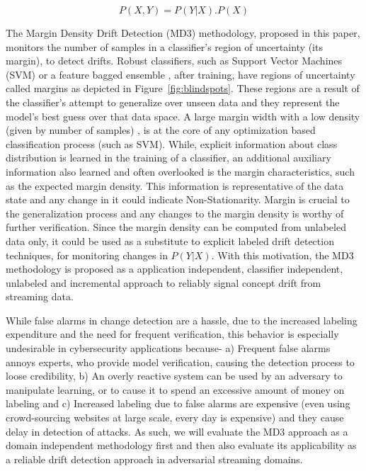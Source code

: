 \documentclass[authoryear,3p,times,twocolumn]{elsarticle}
\begin{document}
\begin{equation}
P(X,Y) = P(Y|X) . P(X)
\label{eqn:conceptdrift}
\end{equation}

The Margin Density Drift Detection (MD3) methodology, proposed in this paper, monitors the number of samples in a classifier's region of uncertainty (its margin), to detect drifts. Robust classifiers, such as Support Vector Machines (SVM) \citep{chang2011libsvm} or a feature bagged ensemble \citep{bry}, after training, have regions of uncertainty called margins as depicted in Figure~\ref{fig:blindspots}. These regions are a result of the classifier's attempt to generalize over unseen data and they represent the model's best guess over that data space. A large margin width with a low density (given by number of samples) , is at the core of any optimization based classification process (such as SVM). While, explicit information about class distribution is learned in the training of a classifier, an additional auxiliary information also learned and often overlooked is the margin characteristics, such as the expected margin density. This information is representative of the data state and any change in it could indicate Non-Stationarity. Margin is crucial to the generalization process and any changes to the margin density is worthy of further verification. Since the margin density can be computed from unlabeled data only, it could be used as a substitute to explicit labeled drift detection techniques, for monitoring changes in $P(Y|X)$. With this motivation, the MD3 methodology is proposed as a application independent, classifier independent, unlabeled and incremental approach to reliably signal concept drift from streaming data.

While false alarms in change detection are a hassle, due to the increased labeling expenditure and the need for frequent verification, this behavior 
is especially undesirable in cybersecurity applications because- a) Frequent false alarms annoys experts, who provide model verification, causing the detection process to loose credibility, b) An overly reactive system can be used by an adversary to manipulate learning, or to cause it to spend an excessive amount of money on labeling \citep{barreno2010security} and c) Increased labeling due to false alarms are expensive (even using crowd-sourcing websites at large scale, every day is expensive) and they cause delay in detection of attacks. As such, we will evaluate the MD3 approach as a domain independent methodology first and then also evaluate its applicability as a reliable drift detection approach in adversarial streaming domains. 
\end{document}
